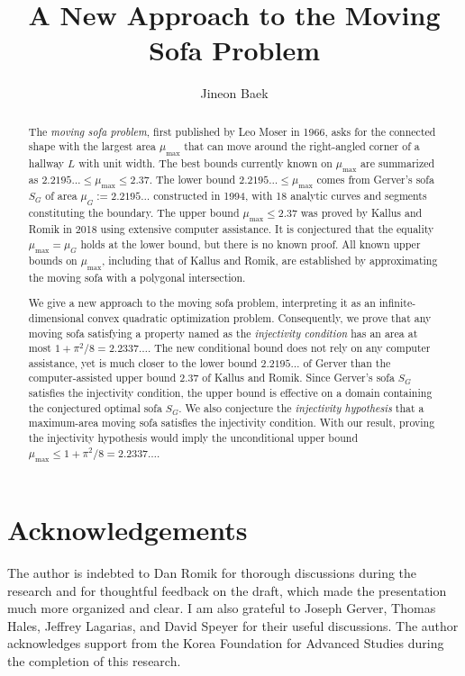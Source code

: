 \documentclass[10pt]{article}
\title{A New Approach to the Moving Sofa Problem}
\author{Jineon Baek}
\theoremstyle{plain}
\theoremstyle{definition}
\theoremstyle{remark}
\begin{document}
\maketitle

\begin{abstract}
    The \emph{moving sofa problem}, first published by Leo Moser in 1966, asks for the connected shape with the largest area $\mu_{\text{max}}$ that can move around the right-angled corner of a hallway $L$ with unit width. The best bounds currently known on $\mu_{\max}$ are summarized as $2.2195\ldots \leq \mu_{\max} \leq 2.37$. The lower bound $2.2195\ldots \leq \mu_{\max}$ comes from Gerver's sofa $S_G$ of area $\mu_G := 2.2195\ldots$ constructed in 1994, with 18 analytic curves and segments constituting the boundary. The upper bound $\mu_{\max} \leq 2.37$ was proved by Kallus and Romik in 2018 using extensive computer assistance. It is conjectured that the equality $\mu_{\max} = \mu_G$ holds at the lower bound, but there is no known proof. All known upper bounds on $\mu_{\max}$, including that of Kallus and Romik, are established by approximating the moving sofa with a polygonal intersection.

    We give a new approach to the moving sofa problem, interpreting it as an infinite-dimensional convex quadratic optimization problem. Consequently, we prove that any moving sofa satisfying a property named as the \emph{injectivity condition} has an area at most $1 + \pi^2/8 = 2.2337\dots$. The new conditional bound does not rely on any computer assistance, yet is much closer to the lower bound $2.2195\ldots$ of Gerver than the computer-assisted upper bound $2.37$ of Kallus and Romik. Since Gerver's sofa $S_G$ satisfies the injectivity condition, the upper bound is effective on a domain containing the conjectured optimal sofa $S_G$. We also conjecture the \emph{injectivity hypothesis} that a maximum-area moving sofa satisfies the injectivity condition. With our result, proving the injectivity hypothesis would imply the unconditional upper bound $\mu_{\max} \leq 1 + \pi^2/8 = 2.2337\ldots$.
\end{abstract}

\tableofcontents



\section*{Acknowledgements}

The author is indebted to Dan Romik for thorough discussions during the research and for thoughtful feedback on the draft, which made the presentation much more organized and clear. I am also grateful to Joseph Gerver, Thomas Hales, Jeffrey Lagarias, and David Speyer for their useful discussions. The author acknowledges support from the Korea Foundation for Advanced Studies during the completion of this research.

\printbibliography
\end{document}
